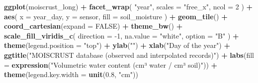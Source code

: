 \documentclass[]{article}
\newenvironment{Shaded}{\begin{snugshade}}{\end{snugshade}}
\newcommand{\DataTypeTok}[1]{\textcolor[rgb]{0.13,0.29,0.53}{#1}}
\newcommand{\DecValTok}[1]{\textcolor[rgb]{0.00,0.00,0.81}{#1}}
\newcommand{\FloatTok}[1]{\textcolor[rgb]{0.00,0.00,0.81}{#1}}
\newcommand{\KeywordTok}[1]{\textcolor[rgb]{0.13,0.29,0.53}{\textbf{#1}}}
\newcommand{\NormalTok}[1]{#1}
\newcommand{\OperatorTok}[1]{\textcolor[rgb]{0.81,0.36,0.00}{\textbf{#1}}}
\newcommand{\OtherTok}[1]{\textcolor[rgb]{0.56,0.35,0.01}{#1}}
\newcommand{\StringTok}[1]{\textcolor[rgb]{0.31,0.60,0.02}{#1}}
\begin{document}
\begin{Shaded}
\begin{Highlighting}[]
\KeywordTok{ggplot}\NormalTok{(moiscrust_long) }\OperatorTok{+}\StringTok{ }
\StringTok{  }\KeywordTok{facet_wrap}\NormalTok{(}
    \StringTok{"year"}\NormalTok{, }
    \DataTypeTok{scales =} \StringTok{"free_x"}\NormalTok{, }
    \DataTypeTok{ncol =} \DecValTok{2}
\NormalTok{    ) }\OperatorTok{+}
\StringTok{  }\KeywordTok{aes}\NormalTok{(}
    \DataTypeTok{x =}\NormalTok{ year_day, }
    \DataTypeTok{y =}\NormalTok{ sensor, }
    \DataTypeTok{fill =}\NormalTok{ soil_moisture}
\NormalTok{    ) }\OperatorTok{+}\StringTok{ }
\StringTok{  }\KeywordTok{geom_tile}\NormalTok{() }\OperatorTok{+}\StringTok{ }
\StringTok{  }\KeywordTok{coord_cartesian}\NormalTok{(}\DataTypeTok{expand =} \OtherTok{FALSE}\NormalTok{) }\OperatorTok{+}
\StringTok{  }\KeywordTok{theme_bw}\NormalTok{() }\OperatorTok{+}\StringTok{ }
\StringTok{  }\KeywordTok{scale_fill_viridis_c}\NormalTok{(}
    \DataTypeTok{direction =} \DecValTok{-1}\NormalTok{, }
    \DataTypeTok{na.value =} \StringTok{"white"}\NormalTok{, }
    \DataTypeTok{option =} \StringTok{"B"}
\NormalTok{    ) }\OperatorTok{+}
\StringTok{  }\KeywordTok{theme}\NormalTok{(}\DataTypeTok{legend.position =} \StringTok{"top"}\NormalTok{) }\OperatorTok{+}\StringTok{ }
\StringTok{  }\KeywordTok{ylab}\NormalTok{(}\StringTok{""}\NormalTok{) }\OperatorTok{+}\StringTok{ }
\StringTok{  }\KeywordTok{xlab}\NormalTok{(}\StringTok{"Day of the year"}\NormalTok{) }\OperatorTok{+}
\StringTok{  }\KeywordTok{ggtitle}\NormalTok{(}\StringTok{"MOISCRUST database (observed and interpolated records)"}\NormalTok{) }\OperatorTok{+}
\StringTok{  }\KeywordTok{labs}\NormalTok{(}\DataTypeTok{fill =} \KeywordTok{expression}\NormalTok{(}\StringTok{"Volumetric water content (cm³ water / cm³ soil)"}\NormalTok{)) }\OperatorTok{+}\StringTok{ }
\StringTok{  }\KeywordTok{theme}\NormalTok{(}\DataTypeTok{legend.key.width =} \KeywordTok{unit}\NormalTok{(}\FloatTok{0.8}\NormalTok{, }\StringTok{"cm"}\NormalTok{))}
\end{Highlighting}
\end{Shaded}
\end{document}
